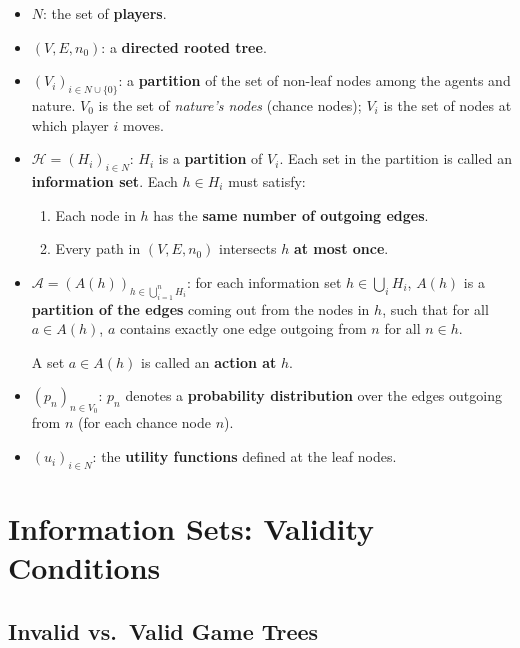 \documentclass[12pt, a4paper]{article}
\begin{document}
\begin{itemize}
  \item $N$: the set of \textbf{players}.

  \item $(V, E, n_0)$: a \textbf{directed rooted tree}.

  \item $(V_i)_{i \in N \cup \{0\}}$: a \textbf{partition} of the set of non-leaf nodes among the agents and nature. $V_0$ is the set of \emph{nature's nodes} (chance nodes); $V_i$ is the set of nodes at which player $i$ moves.

  \item $\mathcal{H} = (H_i)_{i \in N}$: $H_i$ is a \textbf{partition} of $V_i$. Each set in the partition is called an \textbf{information set}. Each $h \in H_i$ must satisfy:
    \begin{enumerate}
      \item[(i)] Each node in $h$ has the \textbf{same number of outgoing edges}.
      \item[(ii)] Every path in $(V, E, n_0)$ intersects $h$ \textbf{at most once}.
    \end{enumerate}

  \item $\mathcal{A} = (A(h))_{h \in \bigcup_{i=1}^{n} H_i}$: for each information set $h \in \bigcup_{i} H_i$, $A(h)$ is a \textbf{partition of the edges} coming out from the nodes in $h$, such that for all $a \in A(h)$, $a$ contains exactly one edge outgoing from $n$ for all $n \in h$.

    A set $a \in A(h)$ is called an \textbf{action at} $h$.

  \item $(p_n)_{n \in V_0}$: $p_n$ denotes a \textbf{probability distribution} over the edges outgoing from $n$ (for each chance node $n$).

  \item $(u_i)_{i \in N}$: the \textbf{utility functions} defined at the leaf nodes.
\end{itemize}

\section{Information Sets: Validity Conditions}

\subsection{Invalid vs.\ Valid Game Trees}
\end{document}
